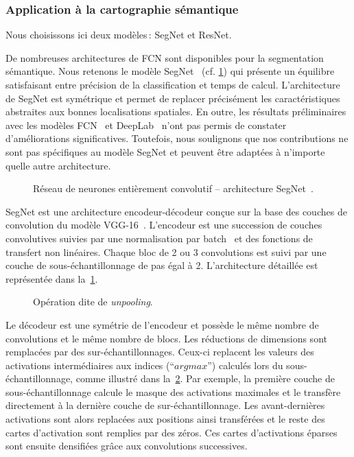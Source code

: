 \subsubsection{Application à la cartographie sémantique}

Nous choisissons ici deux modèles\,: SegNet et ResNet.

De nombreuses architectures de FCN sont disponibles pour la segmentation sémantique. Nous retenons le modèle SegNet~\cite{badrinarayanan_segnet:_2017} (cf. \cref{fig:segnet}) qui présente un équilibre satisfaisant entre précision de la classification et temps de calcul. L'architecture de SegNet est symétrique et permet de replacer précisément les caractéristiques abstraites aux bonnes localisations spatiales. En outre, les résultats préliminaires avec les modèles FCN~\cite{long_fully_2015} et DeepLab~\cite{l._c._chen_deeplab:_2018} n'ont pas permis de constater d'améliorations significatives. Toutefois, nous soulignons que nos contributions ne sont pas spécifiques au modèle SegNet et peuvent être adaptées à n'importe quelle autre architecture.

\begin{figure}
\resizebox{\textwidth}{!}{%

}
\caption{Réseau de neurones entièrement convolutif -- architecture SegNet~\cite{badrinarayanan_segnet:_2017}.}
\label{fig:segnet}
\end{figure}

SegNet est une architecture encodeur-décodeur conçue sur la base des couches de convolution du modèle VGG-16~\cite{chatfield_return_2014,simonyan_very_2013}. L'encodeur est une succession de couches convolutives suivies par une normalisation par batch~\cite{ioffe_batch_2015} et des fonctions de transfert non linéaires. Chaque bloc de 2 ou 3 convolutions est suivi par une couche de sous-échantillonnage de pas égal à 2. L'architecture détaillée est représentée dans la~\cref{fig:segnet}.

\begin{figure}

\caption{Opération dite de \emph{unpooling}.}
\label{fig:unpooling}
\end{figure}

Le décodeur est une symétrie de l'encodeur et possède le même nombre de convolutions et le même nombre de blocs. Les réductions de dimensions sont remplacées par des sur-échantillonnages. Ceux-ci replacent les valeurs des activations intermédiaires aux indices (``$argmax$'') calculés lors du sous-échantillonnage, comme illustré dans la~\cref{fig:unpooling}. Par exemple, la première couche de sous-échantillonnage calcule le masque des activations maximales et le transfère directement à la dernière couche de sur-échantillonnage. Les avant-dernières activations sont alors replacées aux positions ainsi transférées et le reste des cartes d'activation sont remplies par des zéros. Ces cartes d'activations éparses sont ensuite densifiées grâce aux convolutions successives.

